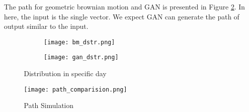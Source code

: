 \documentclass{article}
\begin{document}
	The path for geometric brownian motion and GAN is presented in Figure \ref{fig:path}. In here, the input is the single vector. 
	We expect GAN can generate the path of output similar to the input. 
	\begin{figure}
		\begin{subfigure}[b]{0.5\textwidth}
			\texttt{[image: bm\_dstr.png]}
		\end{subfigure}
	\hfill
		\begin{subfigure}[b]{0.5\textwidth}
		\texttt{[image: gan\_dstr.png]}
		\end{subfigure}
	\caption{Distribution in specific day}
		\label{fig:dstr}
	\end{figure}
	
	\begin{figure}
		\centering
		\texttt{[image: path\_comparision.png]}
		\caption{Path Simulation}
		\label{fig:path}
	\end{figure}
	
	
	
	
\end{document}
